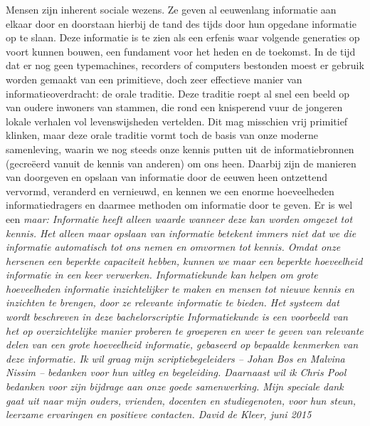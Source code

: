 Mensen zijn inherent sociale wezens. Ze geven al eeuwenlang informatie aan 
elkaar door en doorstaan hierbij de tand des tijds door hun opgedane informatie 
op te slaan. Deze informatie is te zien als een erfenis waar volgende generaties 
op voort kunnen bouwen, een fundament voor het heden en de toekomst.
\vl
In de tijd dat er nog geen typemachines, recorders of computers bestonden moest 
er gebruik worden gemaakt van een primitieve, doch zeer effectieve manier van 
informatieoverdracht: de orale traditie. Deze traditie roept al snel een beeld 
op van oudere inwoners van stammen, die rond een knisperend vuur de jongeren 
lokale verhalen vol levenswijsheden vertelden. Dit mag misschien vrij primitief 
klinken, maar deze orale traditie vormt toch de basis van onze moderne 
samenleving, waarin we nog steeds onze kennis putten uit de informatiebronnen 
(gecreëerd vanuit de kennis van anderen) om ons heen. Daarbij zijn de manieren 
van doorgeven en opslaan van informatie door de eeuwen heen ontzettend vervormd, 
veranderd en vernieuwd, en kennen we een enorme hoeveelheden 
informatiedragers en daarmee methoden om informatie door te geven.
\vl
Er is wel een \it{maar}: Informatie heeft alleen waarde wanneer deze kan worden 
omgezet tot \it{kennis}. Het alleen maar opslaan van informatie betekent immers niet 
dat we die informatie automatisch tot ons nemen en omvormen tot kennis. Omdat 
onze hersenen een beperkte capaciteit hebben, kunnen we maar een beperkte 
hoeveelheid informatie in een keer verwerken. Informatiekunde kan helpen om 
grote hoeveelheden informatie inzichtelijker te maken en mensen tot nieuwe 
kennis en inzichten te brengen, door ze relevante informatie te bieden.
\vl
Het systeem dat wordt beschreven in deze bachelorscriptie Informatiekunde is een voorbeeld van het op 
overzichtelijke manier proberen te groeperen en weer te geven van relevante 
delen van een grote hoeveelheid informatie, gebaseerd op bepaalde kenmerken van 
deze informatie. 
\vl
Ik wil graag mijn scriptiebegeleiders – Johan Bos en Malvina Nissim – bedanken voor 
hun uitleg en begeleiding. Daarnaast wil ik Chris Pool bedanken voor zijn bijdrage
aan onze goede samenwerking. Mijn speciale dank gaat uit naar mijn ouders, vrienden, 
docenten en studiegenoten, voor hun steun, leerzame ervaringen en positieve contacten.
\vl
\it{David de Kleer, juni 2015}

\newpage
\null\vspace{\fill}

